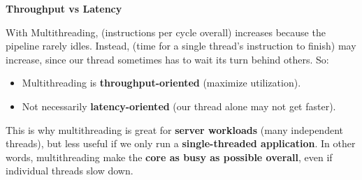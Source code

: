 \begin{flushleft}
    \textcolor{Green3}{ \textbf{Throughput vs Latency}}
\end{flushleft}
With Multithreading,  (instructions per cycle overall) increases because the pipeline rarely idles. Instead,  (time for a single thread's instruction to finish) may increase, since our thread sometimes has to wait its turn behind others. So:
\begin{itemize}
    \item Multithreading is \textbf{throughput-oriented} (maximize utilization).
    \item Not necessarily \textbf{latency-oriented} (our thread alone may not get faster).
\end{itemize}
This is why multithreading is great for \textbf{server workloads} (many independent threads), but less useful if we only run a \textbf{single-threaded application}. In other words, multithreading make the \textbf{core as busy as possible overall}, even if individual threads slow down.